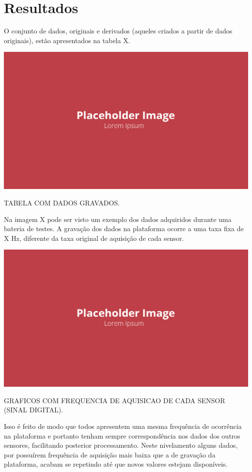 \chapter{Resultados}\label{chp:res}

O conjunto de dados, originais e derivados (aqueles criados a partir de dados originais), estão apresentados na tabela X.

\begin{table}[!ht]
    \centering
    \includegraphics[width=.8\linewidth]{figuras/placeholder.png}
    \caption{TABELA COM DADOS GRAVADOS\cite{autor}.}
    \label{fig:placeholder}
\end{table}

Na imagem X pode ser visto um exemplo dos dados adquiridos durante uma bateria de testes. A gravação dos dados na plataforma ocorre a uma taxa fixa de X Hz, diferente da taxa original de aquisição de cada sensor. 

\begin{table}[!ht]
    \centering
    \includegraphics[width=.8\linewidth]{figuras/placeholder.png}
    \caption{GRAFICOS COM FREQUENCIA DE AQUISICAO DE CADA SENSOR (SINAL DIGITAL)\cite{autor}.}
    \label{fig:placeholder}
\end{table}

Isso é feito de modo que todos apresentem uma mesma frequência de ocorrência na plataforma e portanto tenham sempre correspondência nos dados dos outros sensores, facilitando posterior processamento. Neste nivelamento alguns dados, por possuírem frequência de aquisição mais baixa que a de gravação da plataforma, acabam se repetindo até que novos valores estejam disponíveis.

